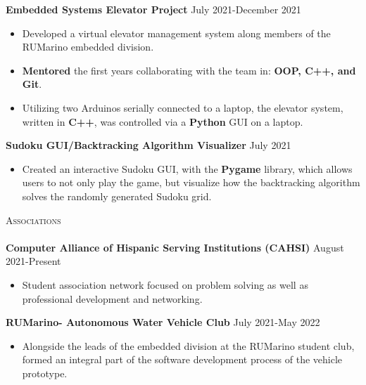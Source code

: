 \documentclass[a4paper]{article}
\newcommand{\lineunder} {
    \vspace*{-8pt} \\
    \hspace*{-18pt} \hrulefill \\
}
\newcommand{\header} [1] {
    {\hspace*{-18pt}\vspace*{6pt} \textsc{#1}}
    \vspace*{-6pt} \lineunder
}
\begin{document}
{\textbf{Embedded Systems Elevator Project}} \hfill \hfill July 2021-December 2021\\
\vspace{-2mm}

\begin{itemize} \itemsep -1pt
\item Developed a virtual elevator management system along members of the RUMarino embedded division.

\item \textbf{Mentored} the first years collaborating with the team in: \textbf{OOP, C++, and Git}.

\item Utilizing two Arduinos serially connected to a laptop, the elevator system, written in \textbf{C++}, was controlled via a \textbf{Python} GUI on a laptop.\\
\end{itemize}
\vspace*{-0.5mm}

{\textbf{Sudoku GUI/Backtracking Algorithm Visualizer}} \hfill July 2021  \\
\vspace{-1.8mm}
\begin{itemize} \itemsep -1pt
\item Created an interactive Sudoku GUI, with the \textbf{Pygame} library, which allows users to not only play the game, but visualize how the backtracking algorithm solves the randomly generated Sudoku grid.
\end{itemize}

\header{Associations}

\vspace{-1mm} \textbf{Computer Alliance of Hispanic Serving Institutions (CAHSI)} \hfill August 2021-Present\\
\begin{itemize} \itemsep -1pt
\vspace{-2mm}
\item Student association network focused on problem solving as well as professional development and networking. \\
\end{itemize}

\vspace{-1mm}
\textbf{RUMarino- Autonomous Water Vehicle Club} \hfill July 2021-May 2022 \\ 
\vspace{-2mm}
\begin{itemize} \itemsep -1pt
\item Alongside the leads of the embedded division at the RUMarino student club, formed an integral part of the software development process of the vehicle prototype. \\ 
\end{itemize}
 


\ 
\end{document}
